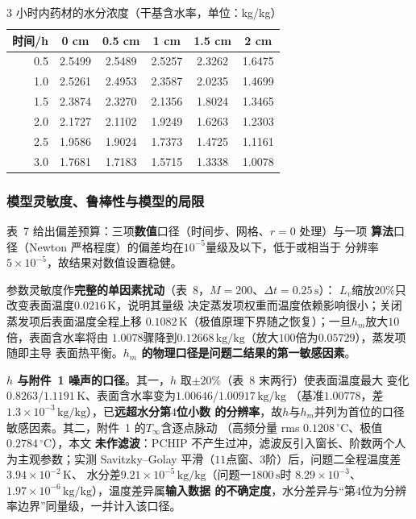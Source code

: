 \documentclass[withoutpreface,bwprint]{cumcmthesis} %
\begin{document}
\begin{table}[!htbp]
    \centering
    \caption{3 小时内药材的水分浓度（干基含水率，单位：kg/kg）}
    \label{tab:q2t4}
    \begin{tabular}{rccccc}
    \toprule
    时间/h & 0 cm & 0.5 cm & 1 cm & 1.5 cm & 2 cm \\
    \midrule
    0.5 & 2.5499 & 2.5489 & 2.5257 & 2.3262 & 1.6475 \\
    1.0 & 2.5261 & 2.4953 & 2.3587 & 2.0235 & 1.4699 \\
    1.5 & 2.3874 & 2.3270 & 2.1356 & 1.8024 & 1.3465 \\
    2.0 & 2.1727 & 2.1102 & 1.9249 & 1.6263 & 1.2303 \\
    2.5 & 1.9586 & 1.9024 & 1.7373 & 1.4725 & 1.1161 \\
    3.0 & 1.7681 & 1.7183 & 1.5715 & 1.3338 & 1.0078 \\
    \bottomrule
    \end{tabular}
\end{table}


\subsubsection{模型灵敏度、鲁棒性与模型的局限}
\label{sec:q2limit}

表~7 给出偏差预算：三项\textbf{数值}口径（时间步、网格、$r=0$ 处理）与一项
\textbf{算法}口径（Newton 严格程度）的偏差均在$10^{-5}$量级及以下，低于或相当于
分辨率$5\times10^{-5}$，故结果对数值设置稳健。

参数灵敏度作\textbf{完整的单因素扰动}（表~8，$M=200$、$\Delta t=0.25\,\mathrm{s}$）：
$L_v$缩放$20\%$只改变表面温度$0.0216\,\mathrm{K}$，说明其量级
决定蒸发项权重而温度依赖影响很小；关闭蒸发项后表面温度全程上移
$0.1082\,\mathrm{K}$（极值原理下界随之恢复）；一旦$h_m$放大$10$倍，表面含水率将由
$1.0078$骤降到$0.12668\,\mathrm{kg/kg}$（放大$100$倍为$0.05729$），蒸发项随即主导
表面热平衡。\textbf{$h_m$ 的物理口径是问题二结果的第一敏感因素}。

\textbf{$h$ 与附件~1 噪声的口径}。其一，$h$ 取$\pm20\%$（表~8 末两行）使表面温度最大
变化$0.8263$/$1.1191\,\mathrm{K}$、表面含水率变为$1.00646$/$1.00917\,\mathrm{kg/kg}$
（基准$1.00778$，差$1.3\times10^{-3}\,\mathrm{kg/kg}$），已\textbf{远超水分第$4$位小数
的分辨率}，故$h$与$h_m$并列为首位的口径敏感因素。其二，附件~1 的$T_\infty$含逐点脉动
（高频分量 rms $0.1208\,^\circ\mathrm{C}$、极值$0.2784\,^\circ\mathrm{C}$），本文
\textbf{未作滤波}：PCHIP 不产生过冲，滤波反引入窗长、阶数两个人为主观参数；实测
Savitzky--Golay 平滑（$11$点窗、$3$阶）后，问题二全程温度差$3.94\times10^{-2}\,\mathrm{K}$、
水分差$9.21\times10^{-5}\,\mathrm{kg/kg}$（问题一$1800\,\mathrm{s}$时
$8.29\times10^{-3}$、$1.97\times10^{-6}\,\mathrm{kg/kg}$），温度差异属\textbf{输入数据
的不确定度}，水分差异与``第$4$位为分辨率边界''同量级，一并计入该口径。
\end{document}
